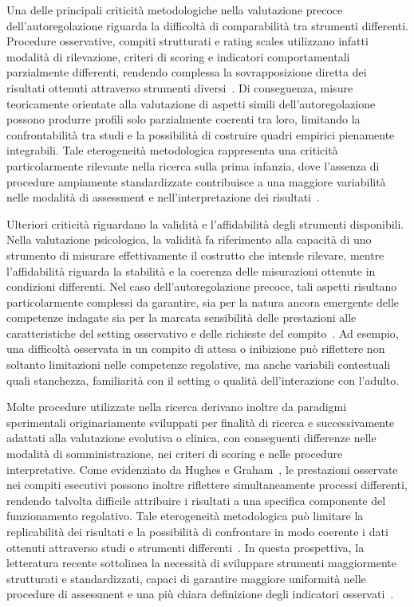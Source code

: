             Una delle principali criticità metodologiche nella valutazione precoce dell'autoregolazione riguarda la difficoltà di comparabilità tra strumenti differenti. Procedure osservative, compiti strutturati e rating scales utilizzano infatti modalità di rilevazione, criteri di scoring e indicatori comportamentali parzialmente differenti, rendendo complessa la sovrapposizione diretta dei risultati ottenuti attraverso strumenti diversi~\cite{toplak2013}. Di conseguenza, misure teoricamente orientate alla valutazione di aspetti simili dell'autoregolazione possono produrre profili solo parzialmente coerenti tra loro, limitando la confrontabilità tra studi e la possibilità di costruire quadri empirici pienamente integrabili. Tale eterogeneità metodologica rappresenta una criticità particolarmente rilevante nella ricerca sulla prima infanzia, dove l'assenza di procedure ampiamente standardizzate contribuisce a una maggiore variabilità nelle modalità di assessment e nell'interpretazione dei risultati~\cite{berni2025}.

            Ulteriori criticità riguardano la validità e l'affidabilità degli strumenti disponibili. Nella valutazione psicologica, la validità fa riferimento alla capacità di uno strumento di misurare effettivamente il costrutto che intende rilevare, mentre l'affidabilità riguarda la stabilità e la coerenza delle misurazioni ottenute in condizioni differenti. Nel caso dell'autoregolazione precoce, tali aspetti risultano particolarmente complessi da garantire, sia per la natura ancora emergente delle competenze indagate sia per la marcata sensibilità delle prestazioni alle caratteristiche del setting osservativo e delle richieste del compito~\cite{carlson2005}. Ad esempio, una difficoltà osservata in un compito di attesa o inibizione può riflettere non soltanto limitazioni nelle competenze regolative, ma anche variabili contestuali quali stanchezza, familiarità con il setting o qualità dell'interazione con l'adulto.

            Molte procedure utilizzate nella ricerca derivano inoltre da paradigmi sperimentali originariamente sviluppati per finalità di ricerca e successivamente adattati alla valutazione evolutiva o clinica, con conseguenti differenze nelle modalità di somministrazione, nei criteri di scoring e nelle procedure interpretative. Come evidenziato da Hughes e Graham~\cite{hughes2002}, le prestazioni osservate nei compiti esecutivi possono inoltre riflettere simultaneamente processi differenti, rendendo talvolta difficile attribuire i risultati a una specifica componente del funzionamento regolativo. Tale eterogeneità metodologica può limitare la replicabilità dei risultati e la possibilità di confrontare in modo coerente i dati ottenuti attraverso studi e strumenti differenti~\cite{berni2025}. In questa prospettiva, la letteratura recente sottolinea la necessità di sviluppare strumenti maggiormente strutturati e standardizzati, capaci di garantire maggiore uniformità nelle procedure di assessment e una più chiara definizione degli indicatori osservati~\cite{mcclelland2012,carlson2005}.

